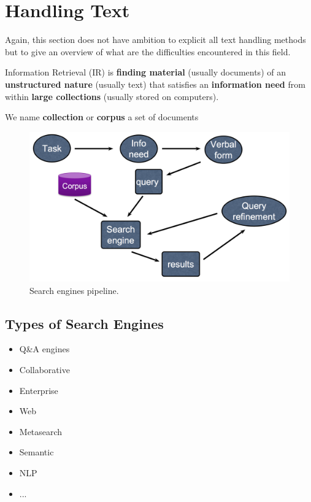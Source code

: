 

\section{Handling Text}

Again, this section does not have ambition to explicit all text handling methods but to give an overview of what are the difficulties encountered in this field.

Information Retrieval (IR) is \textbf{finding material} (usually documents) of an \textbf{unstructured nature} (usually text) that satisfies an \textbf{information need} from within \textbf{large collections} (usually stored on computers).

We name {\bf collection} or {\bf corpus} a set of documents

\begin{figure}[H]%
 \centering
 \includegraphics[width=13cm]{./img/11/SE_pipeline}
 \caption{\label{pic:SE_pipline} Search engines pipeline.}
\end{figure}

\subsection{Types of Search Engines}

\begin{itemize}
	\item Q\&A engines
	\item Collaborative
	\item Enterprise
	\item Web
	\item Metasearch
	\item Semantic
	\item NLP
	\item ...
\end{itemize}


